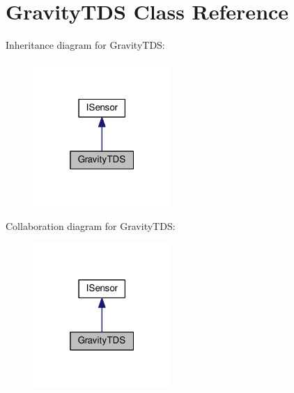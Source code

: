 \hypertarget{class_gravity_t_d_s}{}\section{Gravity\+T\+DS Class Reference}
\label{class_gravity_t_d_s}


Inheritance diagram for Gravity\+T\+DS\+:\nopagebreak
\begin{figure}[H]
\begin{center}
\leavevmode
\includegraphics[width=148pt]{class_gravity_t_d_s__inherit__graph}
\end{center}
\end{figure}


Collaboration diagram for Gravity\+T\+DS\+:\nopagebreak
\begin{figure}[H]
\begin{center}
\leavevmode
\includegraphics[width=148pt]{class_gravity_t_d_s__coll__graph}
\end{center}
\end{figure}
